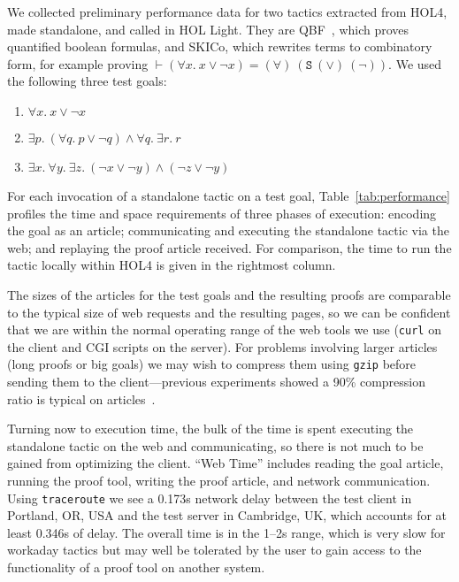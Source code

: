 \documentclass{llncs}
\begin{document}
We collected preliminary performance data for two tactics extracted from HOL4, made standalone, and called in HOL Light.
They are QBF~\cite{DBLP:conf/itp/KumarW11}, which proves quantified boolean formulas, and SKICo, which rewrites terms to combinatory form, for example proving $\vdash(\forall{x}.\ x\lor\lnot x)=(\forall)\ (\mathtt{S}\ (\lor)\ (\lnot))$.
We used the following three test goals:
\begin{enumerate}
\item $\forall x.\ x \lor\lnot x$

\item $\exists p.\ (\forall q.\ p \lor\lnot q) \land\forall q.\ \exists r.\ r$

\item $\exists x.\ \forall y.\ \exists z.\ (\lnot x \lor\lnot y) \land (\lnot z\lor\lnot y)$
\end{enumerate}
For each invocation of a standalone tactic on a test goal, Table~\ref{tab:performance} profiles the time and space requirements of three phases of execution: encoding the goal as an article; communicating and executing the standalone tactic via the web; and replaying the proof article received.
For comparison, the time to run the tactic locally within HOL4 is given in the rightmost column.

The sizes of the articles for the test goals and the resulting proofs are comparable to the typical size of web requests and the resulting pages, so we can be confident that we are within the normal operating range of the web tools we use (\texttt{curl} on the client and CGI scripts on the server).
For problems involving larger articles (long proofs or big goals) we may wish to compress them using \texttt{gzip} before sending them to the client---previous experiments showed a 90\% compression ratio is typical on articles~\cite{hurd2009}.

Turning now to execution time, the bulk of the time is spent executing the standalone tactic on the web and communicating, so there is not much to be gained from optimizing the client.
``Web Time'' includes reading the goal article, running the proof tool, writing the proof article, and network communication.
Using \texttt{traceroute} we see a 0.173s network delay between the test client in Portland, OR, USA and the test server in Cambridge, UK, which accounts for at least 0.346s of delay.
The overall time is in the 1--2s range, which is very slow for workaday tactics but may well be tolerated by the user to gain access to the functionality of a proof tool on another system.
\end{document}
